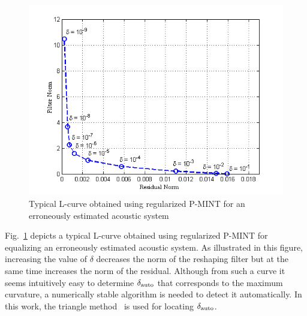 \documentclass{article}
\begin{document}
\begin{figure}[t!]
\centering
\includegraphics[scale = 0.6]{Plots/lcurve_ex}
\caption{Typical L-curve obtained using regularized P-MINT for an erroneously estimated acoustic system}
\label{fig: lcurveex}
\end{figure}

Fig.~\ref{fig: lcurveex} depicts a typical L-curve obtained using regularized P-MINT for equalizing an erroneously estimated acoustic system. 
As illustrated in this figure, increasing the value of $\delta$ decreases the norm of the reshaping filter but at the same time increases the norm of the residual.
Although from such a curve it seems intuitively easy to determine $\delta_{\rm auto}$ that corresponds to the maximum curvature, a numerically stable algorithm is needed to detect it automatically. 
In this work, the triangle method~\cite{Castellanos_2002} is used for locating $\delta_{\rm auto}$.
\end{document}
